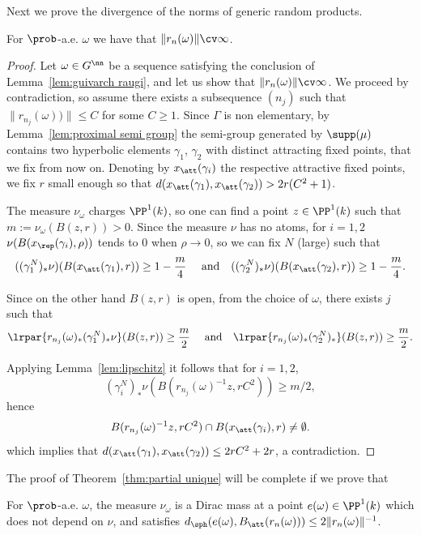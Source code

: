 Next we prove the divergence of the norms of generic random products.

\begin{lemm}\label{lem:contraction}
For $\prob$-a.e. $\omega$ we have that $\| r_n(\omega)\| \cv\infty$.
\end{lemm}

\begin{proof}
Let $\omega \in G^\nn$ be a sequence satisfying the conclusion of Lemma~\ref{lem:guivarch raugi}, and let us show that $\| r_n(\omega)\| \cv\infty$. We proceed by contradiction, so assume there exists a subsequence $(n_j)$ such that $\|r_{n_j}(\omega))\|\leq C$ for some $C\geq 1$. Since $\Gamma$ is non elementary, by Lemma~\ref{lem:proximal semi group} the semi-group generated by $\supp(\mu)$ contains two hyperbolic elements $\gamma_1$, $\gamma_2$ with distinct attracting fixed points, that we fix from now on. Denoting by $x_{\att}(\gamma_i)$ the respective attractive fixed points, we fix $r$ small enough so that $d(x_\att(\gamma_1),x_\att(\gamma_2)) > 2r (C^2+1)$.

The measure $\nu_\omega$ charges $\PP^1(k)$, so one can find a point $z\in \PP^1(k)$ such that $m := \nu_\omega(B(z,r))>0$. Since the measure $\nu$ has no atoms, for $i=1, 2$ $ \nu(B(x_\rep(\gamma_i),\rho))$ tends to $0$ when $\rho\to0$, so we can fix $N$ (large) such that
\[
((\gamma_1^N)_*\nu) (B(x_\att(\gamma_1),r)) \geq 1- \frac{m}{4} \quad\text{ and}\quad ((\gamma_2^{N})_*\nu)(B(x_\att(\gamma_2),r)) \geq 1- \frac{m}{4}.
\]

Since on the other hand $B(z,r)$ is open, from the choice of $\omega$, there exists $j$ such that
\[
\lrpar{ r_{n_j}(\omega)_* (\gamma_1^N)_*\nu} (B(z,r)) \geq \frac{m}{2}
\quad\text{ and}\quad \lrpar{ r_{n_j}(\omega)_*(\gamma_2^{N})_*} (B(z,r)) \geq \frac{m}{2}.
\]

Applying Lemma~\ref{lem:lipschitz} it follows that for $i=1,2$,
\[
(\gamma_i^N)_*\nu(B(r_{n_j}(\omega)^{-1}z, rC^2))\geq m/2,
\]
hence
\[
B(r_{n_j}(\omega)^{-1}z, rC^2)\cap B(x_\att(\gamma_i),r) \neq \emptyset.
\]
which implies that $d(x_\att(\gamma_1), x_\att(\gamma_2)) \le 2rC^2 + 2r$, a contradiction.
\end{proof}

The proof of Theorem~\ref{thm:partial unique} will be complete if we prove that

\begin{lemm}\label{lem:Dirac}
For $\prob$-a.e. $\omega$, the measure $\nu_\omega$ is a Dirac mass at a point $e(\omega)\in \PP^1(k)$ which does not depend on $\nu$, and satisfies $d_{\sph}(e(\omega), B_\att(r_n(\omega))) \le 2\|r_n(\omega)\|^{-1}$.
\end{lemm}

